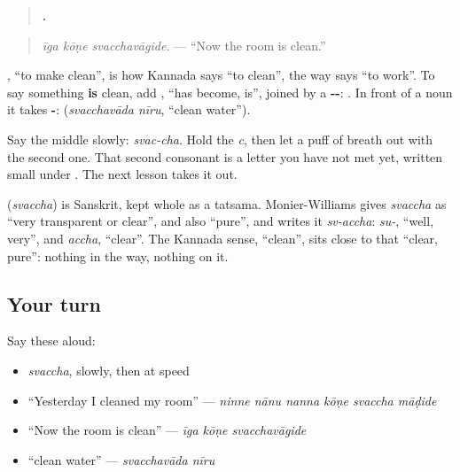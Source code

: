 \begin{quote}
\textbf{  .}
\end{quote}

\begin{quote}
\emph{īga kōṇe svacchavāgide.} — \textquotedblleft{}Now the room is clean.\textquotedblright{}
\end{quote}

\textbf{ }, \textquotedblleft{}to make clean\textquotedblright{}, is how Kannada says \textquotedblleft{}to clean\textquotedblright{}, the way \textbf{ } says \textquotedblleft{}to work\textquotedblright{}. To say something \textbf{is} clean, add \textbf{}, \textquotedblleft{}has become, is\textquotedblright{}, joined by a \textbf{--}: \textbf{}. In front of a noun it takes \textbf{-}: \textbf{ } (\emph{svacchavāda nīru}, \textquotedblleft{}clean water\textquotedblright{}).

Say the middle slowly: \emph{svac-cha}. Hold the \emph{c}, then let a puff of breath out with the second one. That second consonant is a letter you have not met yet, written small under \textbf{}. The next lesson takes it out.

\begin{cousinweb}
\textbf{} (\emph{svaccha}) is Sanskrit, kept whole as a tatsama. Monier-Williams gives \emph{svaccha} as \textquotedblleft{}very transparent or clear\textquotedblright{}, and also \textquotedblleft{}pure\textquotedblright{}, and writes it \emph{sv-accha}: \emph{su-}, \textquotedblleft{}well, very\textquotedblright{}, and \emph{accha}, \textquotedblleft{}clear\textquotedblright{}. The Kannada sense, \textquotedblleft{}clean\textquotedblright{}, sits close to that \textquotedblleft{}clear, pure\textquotedblright{}: nothing in the way, nothing on it.
\end{cousinweb}

\subsection*{Your turn}
Say these aloud:

\begin{itemize}
\raggedright
  \item \emph{svaccha}, slowly, then at speed
  \item \textquotedblleft{}Yesterday I cleaned my room\textquotedblright{} — \emph{ninne nānu nanna kōṇe svaccha māḍide}
  \item \textquotedblleft{}Now the room is clean\textquotedblright{} — \emph{īga kōṇe svacchavāgide}
  \item \textquotedblleft{}clean water\textquotedblright{} — \emph{svacchavāda nīru}
\end{itemize}

